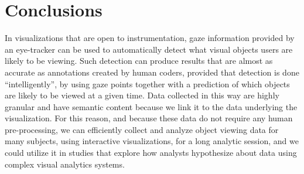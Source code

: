 
\section{Conclusions}
\label{sec:DOICollectionConclusion}
In visualizations that are open to instrumentation, gaze information provided by an eye-tracker can be used to automatically detect what visual objects users are likely to be viewing. Such detection can produce results that are almost as accurate as annotations created by human coders, provided that detection is done ``intelligently'', by using gaze points together with a prediction of which objects are likely to be viewed at a given time. Data collected in this way are highly granular and have semantic content because we link it to the data underlying the visualization. For this reason, and because these data do not require any human pre-processing, we can efficiently collect and analyze object viewing data for many subjects, using interactive visualizations, for a long analytic session, and we could utilize it in studies that explore how analysts hypothesize about data using complex visual analytics systems. 
